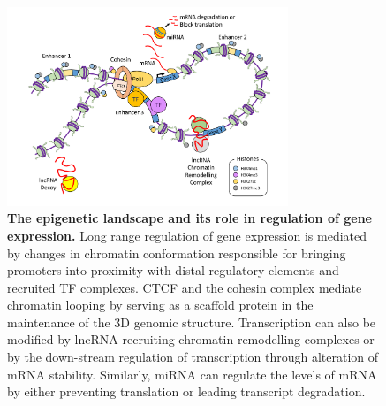 \begin{figure}[h]
\centering
\includegraphics[width=0.75\textwidth]{./Introduction/pdfs/Epigenetic_regulation_diagram}
\caption[The epigenetic landscape and its role in regulation of gene expression. ]{\textbf{The epigenetic landscape and its role in regulation of gene expression.} Long range regulation of gene expression is mediated by changes in chromatin conformation responsible for bringing promoters into proximity with distal regulatory elements and recruited TF complexes. CTCF and the cohesin complex mediate chromatin looping by serving as a scaffold protein in the maintenance of the 3D genomic structure. Transcription can also be modified by lncRNA recruiting chromatin remodelling complexes or by the down-stream regulation of transcription through alteration of mRNA stability. Similarly, miRNA can regulate the levels of mRNA by either preventing translation or leading transcript degradation.}
\label{figure:Epigenetic_regulation}
\end{figure}




